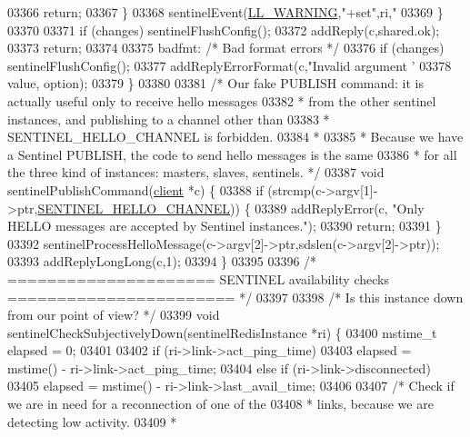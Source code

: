 \begin{DoxyCode}
{{{{{{{{{{{{{{{{{{{{{{{{{{{{{{{{{{{{{{{{{{{{{{{{{{{{{{{{{{{{{{{{{{{{{{{{03366             \textcolor{keywordflow}{return};
03367         \}
03368         sentinelEvent(\hyperlink{server_8h_a31229b9334bba7d6be2a72970967a14b}{LL\_WARNING},\textcolor{stringliteral}{"+set"},ri,\textcolor{stringliteral}{"%
03369     \}
03370 
03371     \textcolor{keywordflow}{if} (changes) sentinelFlushConfig();
03372     addReply(c,shared.ok);
03373     \textcolor{keywordflow}{return};
03374 
03375 badfmt: \textcolor{comment}{/* Bad format errors */}
03376     \textcolor{keywordflow}{if} (changes) sentinelFlushConfig();
03377     addReplyErrorFormat(c,\textcolor{stringliteral}{"Invalid argument '%
03378             value, option);
03379 \}
03380 
03381 \textcolor{comment}{/* Our fake PUBLISH command: it is actually useful only to receive hello messages}
03382 \textcolor{comment}{ * from the other sentinel instances, and publishing to a channel other than}
03383 \textcolor{comment}{ * SENTINEL\_HELLO\_CHANNEL is forbidden.}
03384 \textcolor{comment}{ *}
03385 \textcolor{comment}{ * Because we have a Sentinel PUBLISH, the code to send hello messages is the same}
03386 \textcolor{comment}{ * for all the three kind of instances: masters, slaves, sentinels. */}
03387 \textcolor{keywordtype}{void} sentinelPublishCommand(\hyperlink{structclient}{client} *c) \{
03388     \textcolor{keywordflow}{if} (strcmp(c->argv[1]->ptr,\hyperlink{sentinel_8c_aa57e3638aae4eec03d29f247b1611569}{SENTINEL\_HELLO\_CHANNEL})) \{
03389         addReplyError(c, \textcolor{stringliteral}{"Only HELLO messages are accepted by Sentinel instances."});
03390         \textcolor{keywordflow}{return};
03391     \}
03392     sentinelProcessHelloMessage(c->argv[2]->ptr,sdslen(c->argv[2]->ptr));
03393     addReplyLongLong(c,1);
03394 \}
03395 
03396 \textcolor{comment}{/* ===================== SENTINEL availability checks ======================= */}
03397 
03398 \textcolor{comment}{/* Is this instance down from our point of view? */}
03399 \textcolor{keywordtype}{void} sentinelCheckSubjectivelyDown(sentinelRedisInstance *ri) \{
03400     mstime\_t elapsed = 0;
03401 
03402     \textcolor{keywordflow}{if} (ri->link->act\_ping\_time)
03403         elapsed = mstime() - ri->link->act\_ping\_time;
03404     \textcolor{keywordflow}{else} \textcolor{keywordflow}{if} (ri->link->disconnected)
03405         elapsed = mstime() - ri->link->last\_avail\_time;
03406 
03407     \textcolor{comment}{/* Check if we are in need for a reconnection of one of the}
03408 \textcolor{comment}{     * links, because we are detecting low activity.}
03409 \textcolor{comment}{     *}
}}}}}}}}}}}}}}}}}}}}}}}}}}}}}}}}}}}}}}}}}}}}}}}}}}}}}}}}}}}}}}}}}}}}}}}}}}
\end{DoxyCode}
